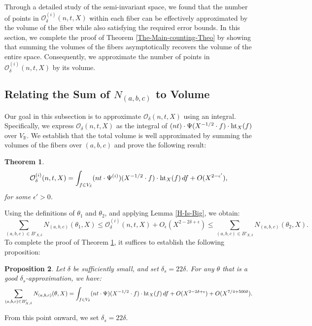 \documentclass{article}
\def \h{{\rm ht}}
\newtheorem{theorem}{Theorem}[section]
\newtheorem{proposition}[theorem]{Proposition}
\def \Bod{{\mathcal{O}^{(i)}_{\delta}(n,t,X)}}
\def \Bodi{{\mathcal{O}}_{\delta}(n,t,X)}
\begin{document}
Through a detailed study of the semi-invariant space, we found that the number of points in $\Bod$ within each fiber can be effectively approximated by the volume of the fiber while also satisfying the required error bounds. In this section, we complete the proof of Theorem \ref{The-Main-counting-Theo} by showing that summing the volumes of the fibers asymptotically recovers the volume of the entire space. Consequently, we approximate the number of points in $\Bod$ by its volume.
\subsection{Relating the Sum of $N_{(a,b,c)}$ to Volume}
Our goal in this subsection is to approximate $\Bodi$ using an integral. Specifically, we express $\Bodi$ as the integral of $(nt) \cdot \Psi(X^{-1/2} \cdot f) \cdot \h_{X}(f)$ over $V_{\mathbb{R}}$. We establish that the total volume is well approximated by summing the volumes of the fibers over $(a, b, c)$ and prove the following result:

\begin{theorem}\label{Goal-fiber-volume}
     \begin{equation*}
         \Bod = \int_{f \in V_{\delta} }(nt \cdot \Psi^{(i)})(X^{-1/2} \cdot f) \cdot \h_{X}(f) \, df + O(X^{2-\epsilon'}),
        \end{equation*} 
for some $\epsilon' > 0$.
\end{theorem}
Using the definitions of $\theta_1$ and $\theta_2$, and applying Lemma \ref{H-Is-Big}, we obtain:
\begin{equation*} 
\sum_{(a,b,c) \in B'_{X,\delta}} N_{(a,b,c)}(\theta_1, X) \leq \Bod + O_{\epsilon}(X^{2-2\delta+\epsilon}) \leq \sum_{(a,b,c) \in B'_{X,\delta}} N_{(a,b,c)}(\theta_2, X).
\end{equation*}  
To complete the proof of Theorem \ref{Goal-fiber-volume}, it suffices to establish the following proposition:

\begin{proposition}\label{Gluing-fiber-volumes} Let $\delta$ be sufficiently small, and set $\delta_s = 22\delta$. For any $\theta$ that is a good $\delta_s$-approximation, we have: 
\begin{equation} \sum_{(a,b,c)\in B_{X,\delta}'} N_{(a,b,c)}(\theta,X) = \int_{f\in V_{\delta}} (nt \cdot \Psi)(X^{-1/2} \cdot f) \cdot \h_{X}(f) \, df + O(X^{2-2\delta+\epsilon})+O(X^{7/4+500\delta}). \end{equation} 
\end{proposition}
From this point onward, we set $\delta_s = 22\delta$.  
\end{document}

